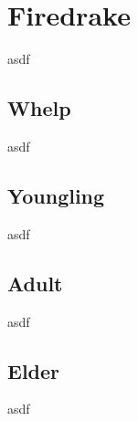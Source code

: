 \section{Firedrake}

asdf

\subsection{Whelp}

asdf

\subsection{Youngling}

asdf

\subsection{Adult}

asdf

\subsection{Elder}

asdf